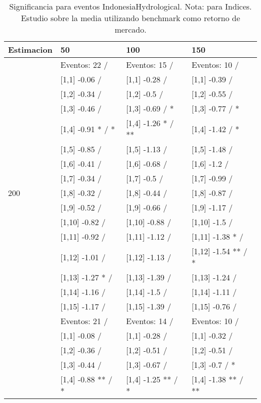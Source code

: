 \begin{table}

\caption{Significancia para eventos IndonesiaHydrological. Nota: para Indices. Estudio sobre la media utilizando benchmark como retorno de mercado.}
\centering
\begin{tabular}[t]{llll}
\toprule
Estimacion & 50 & 100 & 150\\
\midrule
 & Eventos:  22 / & Eventos:  15 / & Eventos:  10 /\\
 & {}[1,1] -0.06  / & {}[1,1] -0.28  / & {}[1,1] -0.39  /\\
 & {}[1,2] -0.34  / & {}[1,2] -0.5  / & {}[1,2] -0.55  /\\
 & {}[1,3] -0.46  / & {}[1,3] -0.69  / * & {}[1,3] -0.77  / *\\
 & {}[1,4] -0.91 * / * & {}[1,4] -1.26 * / ** & {}[1,4] -1.42  / *\\
\addlinespace
 & {}[1,5] -0.85  / & {}[1,5] -1.13  / & {}[1,5] -1.48  /\\
 & {}[1,6] -0.41  / & {}[1,6] -0.68  / & {}[1,6] -1.2  /\\
 & {}[1,7] -0.34  / & {}[1,7] -0.5  / & {}[1,7] -0.99  /\\
200 & {}[1,8] -0.32  / & {}[1,8] -0.44  / & {}[1,8] -0.87  /\\
 & {}[1,9] -0.52  / & {}[1,9] -0.66  / & {}[1,9] -1.17  /\\
\addlinespace
 & {}[1,10] -0.82  / & {}[1,10] -0.88  / & {}[1,10] -1.5  /\\
 & {}[1,11] -0.92  / & {}[1,11] -1.12  / & {}[1,11] -1.38 * /\\
 & {}[1,12] -1.01  / & {}[1,12] -1.13  / & {}[1,12] -1.54 ** / *\\
 & {}[1,13] -1.27 * / & {}[1,13] -1.39  / & {}[1,13] -1.24  /\\
 & {}[1,14] -1.16  / & {}[1,14] -1.5  / & {}[1,14] -1.11  /\\
\addlinespace
 & {}[1,15] -1.17  / & {}[1,15] -1.39  / & {}[1,15] -0.76  /\\
 & Eventos:  21 / & Eventos:  14 / & Eventos:  10 /\\
 & {}[1,1] -0.08  / & {}[1,1] -0.28  / & {}[1,1] -0.32  /\\
 & {}[1,2] -0.36  / & {}[1,2] -0.51  / & {}[1,2] -0.51  /\\
 & {}[1,3] -0.44  / & {}[1,3] -0.67  / & {}[1,3] -0.7  / *\\
\addlinespace
 & {}[1,4] -0.88 ** / * & {}[1,4] -1.25 ** / * & {}[1,4] -1.38 ** / **\\

\end{tabular}
\end{table}
